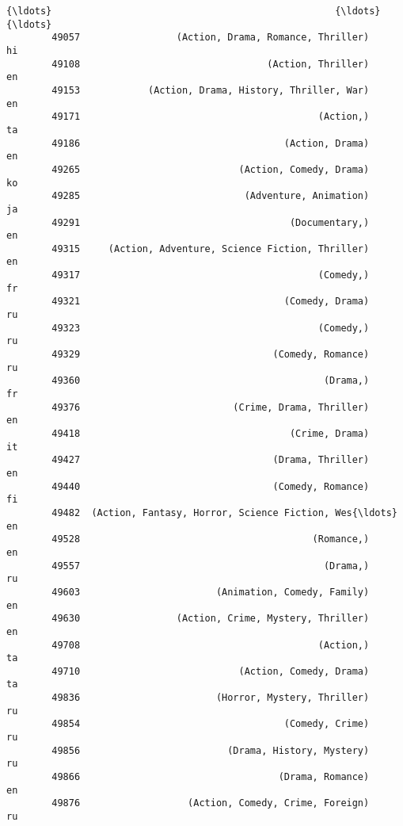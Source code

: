 \documentclass[11pt]{article}
\begin{document}
\begin{Verbatim}[commandchars=\\\{\}]
        {\ldots}                                                  {\ldots}               {\ldots}   
        49057                 (Action, Drama, Romance, Thriller)                hi   
        49108                                 (Action, Thriller)                en   
        49153            (Action, Drama, History, Thriller, War)                en   
        49171                                          (Action,)                ta   
        49186                                    (Action, Drama)                en   
        49265                            (Action, Comedy, Drama)                ko   
        49285                             (Adventure, Animation)                ja   
        49291                                     (Documentary,)                en   
        49315     (Action, Adventure, Science Fiction, Thriller)                en   
        49317                                          (Comedy,)                fr   
        49321                                    (Comedy, Drama)                ru   
        49323                                          (Comedy,)                ru   
        49329                                  (Comedy, Romance)                ru   
        49360                                           (Drama,)                fr   
        49376                           (Crime, Drama, Thriller)                en   
        49418                                     (Crime, Drama)                it   
        49427                                  (Drama, Thriller)                en   
        49440                                  (Comedy, Romance)                fi   
        49482  (Action, Fantasy, Horror, Science Fiction, Wes{\ldots}                en   
        49528                                         (Romance,)                en   
        49557                                           (Drama,)                ru   
        49603                        (Animation, Comedy, Family)                en   
        49630                 (Action, Crime, Mystery, Thriller)                en   
        49708                                          (Action,)                ta   
        49710                            (Action, Comedy, Drama)                ta   
        49836                        (Horror, Mystery, Thriller)                ru   
        49854                                    (Comedy, Crime)                ru   
        49856                          (Drama, History, Mystery)                ru   
        49866                                   (Drama, Romance)                en   
        49876                   (Action, Comedy, Crime, Foreign)                ru   
        

\end{Verbatim}
\end{document}

